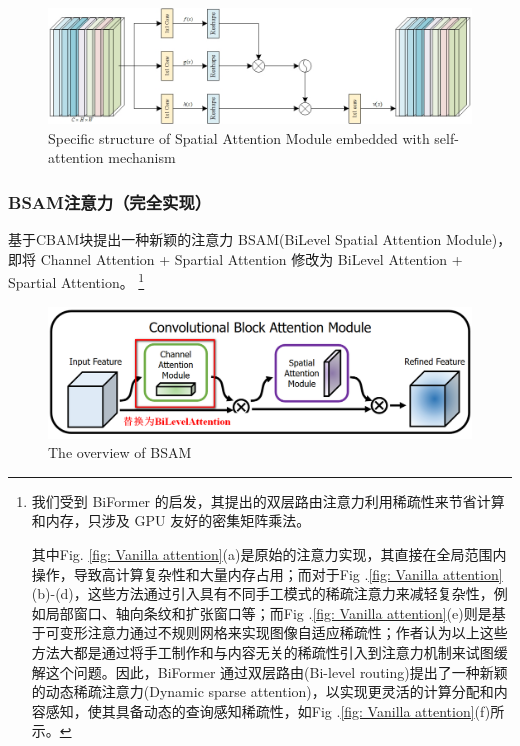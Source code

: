 \documentclass[a4paper]{ctexart}
\begin{document}
		\begin{figure}[htbp]
			\centering
			\includegraphics[width=\linewidth]{picture/LLIE/Experiment/SA_modification}
			\caption{Specific structure of Spatial Attention Module embedded with self-attention mechanism}
			\label{fig: SA_mod}
		\end{figure}
		
		\subsubsection*{BSAM注意力（完全实现）}
		
		基于CBAM块提出一种新颖的注意力 BSAM(BiLevel Spatial Attention Module)，即将 Channel Attention + Spartial Attention 修改为 BiLevel Attention + Spartial Attention。
		\footnote{
		我们受到 BiFormer \cite{zhu2023biformer}的启发，其提出的双层路由注意力利用稀疏性来节省计算和内存，只涉及 GPU 友好的密集矩阵乘法。
			
		其中Fig. \ref{fig: Vanilla attention}(a)是原始的注意力实现，其直接在全局范围内操作，导致高计算复杂性和大量内存占用；而对于Fig .\ref{fig: Vanilla attention}(b)-(d)，这些方法通过引入具有不同手工模式的稀疏注意力来减轻复杂性，例如局部窗口、轴向条纹和扩张窗口等；而Fig .\ref{fig: Vanilla attention}(e)则是基于可变形注意力通过不规则网格来实现图像自适应稀疏性；作者认为以上这些方法大都是通过将手工制作和与内容无关的稀疏性引入到注意力机制来试图缓解这个问题。因此，BiFormer 通过双层路由(Bi-level routing)提出了一种新颖的动态稀疏注意力(Dynamic sparse attention)，以实现更灵活的计算分配和内容感知，使其具备动态的查询感知稀疏性，如Fig .\ref{fig: Vanilla attention}(f)所示。}
		
		\begin{figure}[htbp]
			\centering
			\includegraphics[width=0.8\linewidth]{picture/LLIE/Experiment/BSAM}
			\caption{The overview of BSAM}
			\label{fig: BSAM}
		\end{figure}
		
\end{document}
